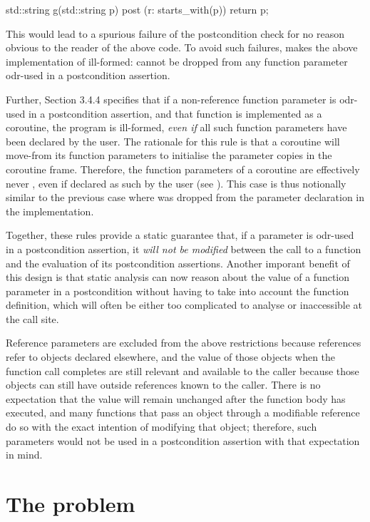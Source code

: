 \begin{codeblock}
std::string g(std::string p) post (r: starts_with(p)) {
  return p; 
}
\end{codeblock}
This would lead to a spurious failure of the postcondition check for no reason obvious to the reader of the above code. To avoid such failures, \cite{P2900R10} makes the above implementation of  ill-formed:  cannot be dropped from any function parameter odr-used in a postcondition assertion.

Further, \cite{P2900R10} Section 3.4.4 specifies that if a non-reference function parameter is odr-used in a postcondition assertion, and that function is implemented as a coroutine, the program is ill-formed, \emph{even if} all such function parameters have been declared  by the user. The rationale for this rule is that a coroutine will move-from its function parameters to initialise the parameter copies in the coroutine frame. Therefore, the function parameters of a coroutine are effectively never , even if declared as such by the user (see \cite{P3387R0}). This case is thus notionally similar to the previous case where  was dropped from the parameter declaration in the implementation.

Together, these rules provide a static guarantee that, if a parameter is odr-used in a postcondition assertion, it \emph{will not be modified} between the call to a function and the evaluation of its postcondition assertions. Another imporant benefit of this design is that static analysis can now reason about the value of a function parameter in a postcondition without having to take into account the function definition, which will often be either too complicated to analyse or inaccessible at the call site.

Reference parameters are excluded from the above restrictions because references refer to objects declared elsewhere, and the value of those objects when the function call completes are still relevant and available to the caller because those objects can still have outside references known to the caller.  
There is no expectation that the value will remain unchanged after the function body has executed, and many functions that pass an object through a modifiable reference do so with the exact intention of modifying that object; therefore, such parameters would not be used in a postcondition assertion with that expectation in mind.

\section{The problem}


